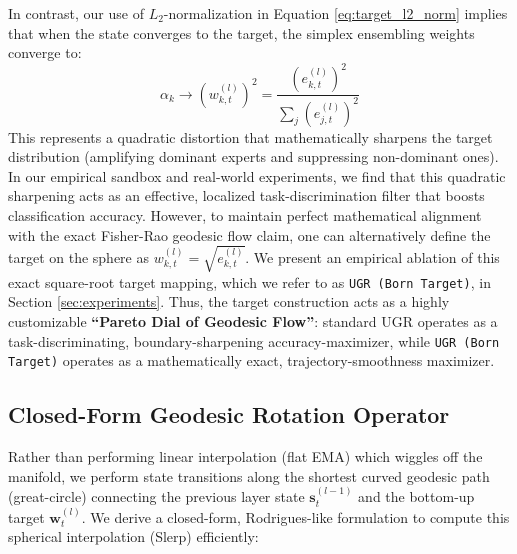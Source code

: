 In contrast, our use of $L_2$-normalization in Equation \eqref{eq:target_l2_norm} implies that when the state converges to the target, the simplex ensembling weights converge to:
\begin{equation}
\alpha_k \to (w_{k, t}^{(l)})^2 = \frac{(e_{k, t}^{(l)})^2}{\sum_j (e_{j, t}^{(l)})^2}
\end{equation}
This represents a quadratic distortion that mathematically sharpens the target distribution (amplifying dominant experts and suppressing non-dominant ones). In our empirical sandbox and real-world experiments, we find that this quadratic sharpening acts as an effective, localized task-discrimination filter that boosts classification accuracy. However, to maintain perfect mathematical alignment with the exact Fisher-Rao geodesic flow claim, one can alternatively define the target on the sphere as $w_{k, t}^{(l)} = \sqrt{e_{k, t}^{(l)}}$. We present an empirical ablation of this exact square-root target mapping, which we refer to as \texttt{UGR (Born Target)}, in Section \ref{sec:experiments}. Thus, the target construction acts as a highly customizable \textbf{``Pareto Dial of Geodesic Flow''}: standard UGR operates as a task-discriminating, boundary-sharpening accuracy-maximizer, while \texttt{UGR (Born Target)} operates as a mathematically exact, trajectory-smoothness maximizer.

\subsection{Closed-Form Geodesic Rotation Operator}
Rather than performing linear interpolation (flat EMA) which wiggles off the manifold, we perform state transitions along the shortest curved geodesic path (great-circle) connecting the previous layer state $\mathbf{s}_t^{(l-1)}$ and the bottom-up target $\mathbf{w}_t^{(l)}$. We derive a closed-form, Rodrigues-like formulation to compute this spherical interpolation (Slerp) efficiently:

